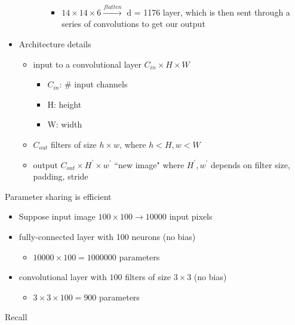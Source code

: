 \documentclass[10pt, oneside]{article}
\begin{document}
\begin{itemize}
\begin{itemize}
\begin{itemize}
\begin{itemize}
                \item $14\times 14\times 6 \overset{flatten}{\rightarrow} $ d = 1176 layer, which is then sent through a series of convolutions to get our output
            \end{itemize}
        \end{itemize}
    \end{itemize}
    \item Architecture details
    \begin{itemize}
        \item input to a convolutional layer $C_{in} \times H \times W$
        \begin{itemize}
            \item $C_{in}$: \# input channels
            \item H: height
            \item W: width
        \end{itemize}
        \item $C_{out}$ filters of size $h\times w$, where $h< H, w < W$
        \item output $C_{out}\times H^\prime \times w^\prime$ ``new image" where $H^\prime, w^\prime$ depends on filter size, padding, stride
    \end{itemize}
\end{itemize}
Parameter sharing is efficient
\begin{itemize}
    \item Suppose input image $100\times 100 \rightarrow 10000$ input pixels
    \item fully-connected layer with 100 neurons (no bias)
    \begin{itemize}
        \item $10000\times 100 = 1000000$ parameters
    \end{itemize}
    \item convolutional layer with $100$ filters of size $3\times 3$ (no bias)
    \begin{itemize}
        \item $3\times 3 \times 100 = 900$ parameters
    \end{itemize}
\end{itemize}
Recall
\end{document}
